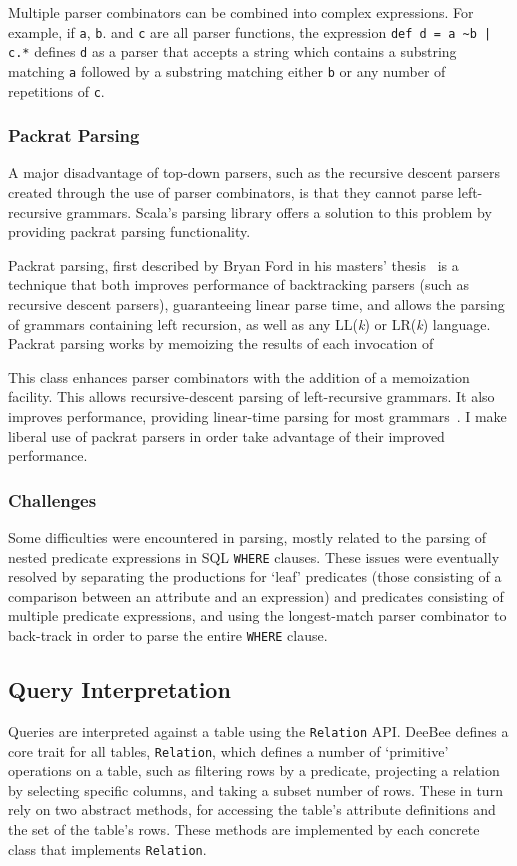 Multiple parser combinators can be combined into complex expressions. For example, if \texttt{a}, \texttt{b}. and \texttt{c} are all parser functions, the expression \texttt{def d = a \textasciitilde b | c.*} defines \texttt{d} as a parser that accepts a string which contains a substring matching \texttt{a} followed by a substring matching either \texttt{b} or any number of repetitions of \texttt{c}.

\subsubsection{Packrat Parsing}
A major disadvantage of top-down parsers, such as the recursive descent parsers created through the use of parser combinators, is that they cannot parse left-recursive grammars. Scala's parsing library offers a solution to this problem by providing packrat parsing functionality.

Packrat parsing, first described by Bryan Ford in his masters' thesis~\cite{ford2002packrat} is a technique that both improves performance of backtracking parsers (such as recursive descent parsers), guaranteeing linear parse time, and allows the parsing of grammars containing left recursion, as well as any LL(\textit{k}) or LR(\textit{k}) language. Packrat parsing works by memoizing the results of each invocation of 

This class enhances parser combinators with the addition of a memoization facility. This allows recursive-descent parsing of left-recursive grammars. It also improves performance, providing linear-time parsing for most grammars~\cite{jonnalagedda2009packrat,ford2002packrat,ford2002packrat2}. I make liberal use of packrat parsers in order take advantage of their improved performance.

\subsubsection{Challenges}
Some difficulties were encountered in parsing, mostly related to the parsing of nested predicate expressions in SQL \texttt{WHERE} clauses. These issues were eventually resolved by separating the productions for `leaf' predicates (those consisting of a comparison between an attribute and an expression) and predicates consisting of multiple predicate expressions, and using the longest-match parser combinator to back-track in order to parse the entire \texttt{WHERE} clause.

\subsection{Query Interpretation}
\label{sec:query}
Queries are interpreted against a table using the \texttt{Relation} API. DeeBee defines a core trait for all tables, \texttt{Relation}, which defines a number of `primitive' operations on a table, such as filtering rows by a predicate, projecting a relation by selecting specific columns, and taking a subset number of rows. These in turn rely on two abstract methods, for accessing the table's attribute definitions and the set of the table's rows. These methods are implemented by each concrete class that implements \texttt{Relation}.

